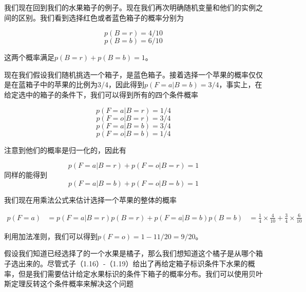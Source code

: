 	我们现在回到我们的水果箱子的例子。现在我们再次明确随机变量和他们的实例之间的区别。我们看到选择红色或者蓝色箱子的概率分别为
	
	\begin{equation}
	p(B = r) = 4/10
	\end{equation}
	\begin{equation}
	p(B = b) = 6/10
	\end{equation}
	
	这两个概率满足$p(B = r) + p(B = b) = 1$。
	
	现在我们假设我们随机挑选一个箱子，是蓝色箱子。接着选择一个苹果的概率仅仅是在蓝箱子中的苹果的比例为3/4，因此得到$p(F = a| B = b) = 3/4$，事实上，在给定选中的箱子的条件下，我们可以得到所有的四个条件概率
	
	\begin{equation}
	p(F = a|B = r) = 1/4
	\end{equation}
	\begin{equation}
	p(F = o|B = r) = 3/4
	\end{equation}
	\begin{equation}
	p(F = a|B = b) = 3/4
	\end{equation}
	\begin{equation}
	p(F = o|B = b) = 1/4
	\end{equation}
	
	注意到他们的概率是归一化的，因此有
	
	\begin{equation}
	p(F = a|B = r) + p(F = o| B = r) = 1
	\end{equation}
	同样的能得到
	\begin{equation}
	p(F = a|B = b) + p(F = o|B = b) = 1
	\end{equation}
	
	我们现在用乘法公式来估计选择一个苹果的整体的概率
	
	\begin{equation}
	\begin{aligned}
	p(F = a) & = p(F = a|B = r)p(B = r) +p(F = a|B = b)p(B = b)
			 & = \frac{1}{4} \times \frac{4}{10} + \frac{3}{4} \times \frac{6}{10}
	\end{aligned}
	\end{equation}
	
	利用加法准则，我们可以得到$p(F = o) = 1 - 11/20 = 9/20$。
	
	假设我们知道已经选择了的一个水果是橘子，那么我们想知道这个橘子是从哪个箱子选出来的。尽管式子（1.16）-（1.19）给出了再给定箱子标识条件下水果的概率，但是我们需要估计给定水果标识的条件下箱子的概率分布。我们可以使用贝叶斯定理反转这个条件概率来解决这个问题
	
